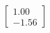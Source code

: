 \documentclass[preview]{standalone}
\begin{document}
\begin{align*}
\begin{bmatrix} 1.00 \\ -1.56 \end{bmatrix}
\end{align*}
\end{document}
